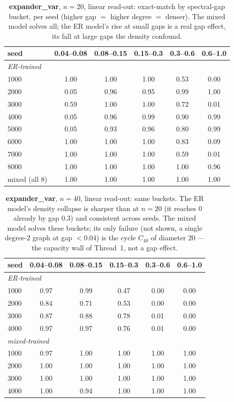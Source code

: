 \documentclass[11pt,a4paper]{article}
\begin{document}
\begin{table}[H]\centering\small
\begin{tabular}{lccccc}
\toprule
seed & 0.04--0.08 & 0.08--0.15 & 0.15--0.3 & 0.3--0.6 & 0.6--1.0 \\
\midrule
\multicolumn{6}{l}{\emph{ER-trained}}\\
1000 & 1.00 & 1.00 & 1.00 & 0.53 & 0.00 \\
2000 & 0.05 & 0.96 & 0.95 & 0.99 & 1.00 \\
3000 & 0.59 & 1.00 & 1.00 & 0.72 & 0.01 \\
4000 & 0.05 & 0.96 & 0.99 & 0.90 & 0.99 \\
5000 & 0.05 & 0.93 & 0.96 & 0.80 & 0.99 \\
6000 & 1.00 & 1.00 & 1.00 & 0.83 & 0.09 \\
7000 & 1.00 & 1.00 & 1.00 & 0.59 & 0.01 \\
8000 & 1.00 & 1.00 & 1.00 & 1.00 & 0.96 \\
\midrule
mixed (all 8) & 1.00 & 1.00 & 1.00 & 1.00 & 1.00 \\
\bottomrule\end{tabular}
\caption{\textbf{expander\_var}, $n=20$, linear read-out: exact-match by spectral-gap bucket, per seed (higher gap
$=$ higher degree $=$ denser). The mixed model solves all; the ER model's rise at small gaps is a
real gap effect, its fall at large gaps the density confound.}
\label{tab:expvar}
\end{table}

\begin{table}[H]\centering\small
\begin{tabular}{lccccc}
\toprule
seed & 0.04--0.08 & 0.08--0.15 & 0.15--0.3 & 0.3--0.6 & 0.6--1.0 \\
\midrule
\multicolumn{6}{l}{\emph{ER-trained}}\\
1000 & 0.97 & 0.99 & 0.47 & 0.00 & 0.00 \\
2000 & 0.84 & 0.71 & 0.53 & 0.00 & 0.00 \\
3000 & 0.87 & 0.88 & 0.78 & 0.01 & 0.00 \\
4000 & 0.97 & 0.97 & 0.76 & 0.01 & 0.00 \\
\midrule
\multicolumn{6}{l}{\emph{mixed-trained}}\\
1000 & 0.97 & 1.00 & 1.00 & 1.00 & 1.00 \\
2000 & 1.00 & 1.00 & 1.00 & 1.00 & 1.00 \\
3000 & 1.00 & 1.00 & 1.00 & 1.00 & 1.00 \\
4000 & 1.00 & 0.94 & 1.00 & 1.00 & 1.00 \\
\bottomrule\end{tabular}
\caption{\textbf{expander\_var}, $n=40$, linear read-out: same buckets. The ER model's density collapse is sharper
than at $n=20$ (it reaches $0$ already by gap $0.3$) and consistent across seeds. The mixed model
solves these buckets; its only failure (not shown, a single degree-$2$ graph at gap $<0.04$) is
the cycle $C_{40}$ of diameter $20$ --- the capacity wall of Thread~1, not a gap effect.}
\label{tab:expvar_n40}
\end{table}
\end{document}

